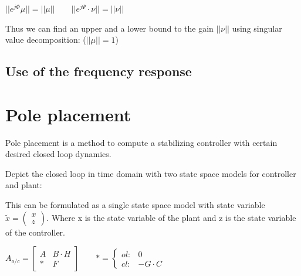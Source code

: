 \documentclass[10pt,a4paper]{scrartcl}
\begin{document}
\begin{multicols*}{3}
	\dahe $||e^{j\Phi}\mu||=||\mu||\qquad||e^{j\Psi}\cdot\nu||=||\nu||$
	
	
	Thus we can find an upper and a lower bound to the gain $||\nu||$ using singular value decomposition: ($||\mu||=1$)
	
	
	\subsection*{Use of the frequency response}
	
	
	
	
	
	
	\section{Pole placement}
	
	Pole placement is a method to compute a stabilizing controller with certain desired closed loop dynamics.
	
	Depict the closed loop in time domain with two state space models for controller and plant:
	
	
	This can be formulated as a single state space model with state variable $\tilde{x}=\begin{pmatrix}x\\z\end{pmatrix}$. Where x is the state variable of the plant and z is the state variable of the controller.
	
	
	$A_{o/c}=\begin{bmatrix}A&B\cdot H\\\ast&F\end{bmatrix}\qquad \ast=\begin{cases}ol:&0\\cl:&-G\cdot C\end{cases}$
	

\end{multicols*}
\end{document}
